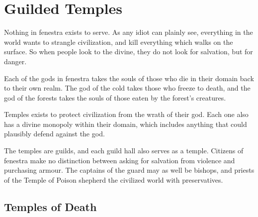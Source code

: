 \chapter{Guilded Temples}

Nothing in \gls{fenestra} exists to serve.
As any idiot can plainly see, everything in the world wants to strangle civilization, and kill everything which walks on the surface.
So when people look to the divine, they do not look for salvation, but for danger.

Each of the gods in \gls{fenestra} takes the souls of those who die in their domain back to their own realm.
The god of the cold takes those who freeze to death, and the god of the forests takes the souls of those eaten by the forest's creatures.

Temples exists to protect civilization from the wrath of their god.
Each one also has a divine monopoly within their domain, which includes anything that could plausibly defend against the god.

The temples are guilds, and each guild hall also serves as a temple.
Citizens of \gls{fenestra} make no distinction between asking for salvation from violence and purchasing armour.
The captains of the \gls{guard} may as well be bishops, and priests of the Temple of Poison shepherd the civilized world with preservatives.

\section{Temples of Death}

